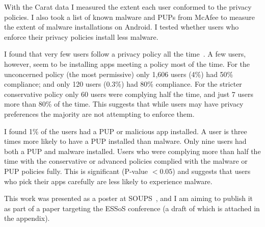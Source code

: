 \documentclass[a4paper]{scrartcl}
\begin{document}
With the Carat data I measured the extent each user conformed to the privacy policies.
I also took a list of known malware and \acp{PUP} from McAfee to measure the extent of malware installations on Android.
I tested whether users who enforce their privacy policies install less malware.

I found that very few users follow a privacy policy all the time~\citep{Hallett:2015ty}.
A few users, however, seem to be installing apps meeting a policy most of the time.
For the unconcerned policy (the most permissive) only 1,606 users (4\%) had 50\% compliance;
and only 120 users (0.3\%) had 80\% compliance.
For the stricter conservative policy only 60 users were complying half the time, and just 7 users more than 80\% of the time.
This suggests that while users may have privacy preferences the majority are not attempting to enforce them.

I found 1\% of the users had a PUP or malicious app installed.
A user is three times more likely to have a PUP installed than malware.
Only nine users had both a PUP and malware installed.
Users who were complying more than half the time with the conservative or advanced policies complied with the malware or PUP policies fully.
This is significant (P-value $< 0.05$) and suggests that users who pick their apps carefully are less likely to experience malware.

%
%

This work was presented as a poster at SOUPS~\citep{Hallett:2015ty}, and I am aiming to publish it as part of a paper targeting the ESSoS conference (a draft of which is attached in the appendix).
\end{document}
